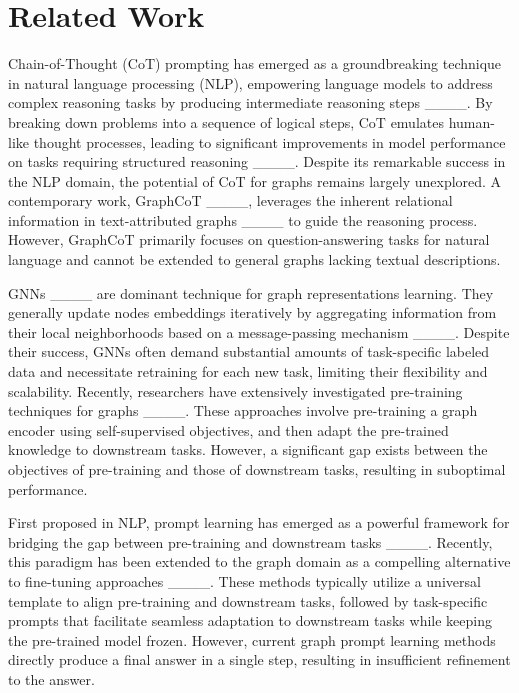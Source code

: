 \section{Related Work}
Chain-of-Thought (CoT) prompting has emerged as a groundbreaking technique in natural language processing (NLP), empowering language models to address complex reasoning tasks by producing intermediate reasoning steps ____. By breaking down problems into a sequence of logical steps, CoT emulates human-like thought processes, leading to significant improvements in model performance on tasks requiring structured reasoning ____. Despite its remarkable success in the NLP domain, the potential of CoT for graphs remains largely unexplored.  A contemporary work, GraphCoT ____, leverages the inherent relational information in text-attributed graphs ____ to guide the reasoning process. However, GraphCoT primarily focuses on question-answering tasks for natural language and cannot be extended to general graphs lacking textual descriptions.

GNNs ____ are dominant technique for graph representations learning. They generally update nodes embeddings iteratively by aggregating information from their local neighborhoods based on a message-passing mechanism ____. Despite their success, GNNs often demand substantial amounts of task-specific labeled data and necessitate retraining for each new task, limiting their flexibility and scalability.
Recently, researchers have extensively investigated pre-training techniques for graphs ____. These approaches involve pre-training a graph encoder using self-supervised objectives, and then adapt the pre-trained knowledge to downstream tasks. However, a significant gap exists between the objectives of pre-training and those of downstream tasks, resulting in suboptimal performance. %


First proposed in NLP, prompt learning has emerged as a powerful framework for bridging the gap between pre-training and downstream tasks ____. Recently, this paradigm has been extended to the graph domain as a compelling alternative to fine-tuning approaches ____. These methods typically utilize a universal template to align pre-training and downstream tasks, followed by task-specific prompts that facilitate seamless adaptation to downstream tasks while keeping the pre-trained model frozen. However, current graph prompt learning methods directly produce a final answer in a single step, resulting in insufficient refinement to the answer.